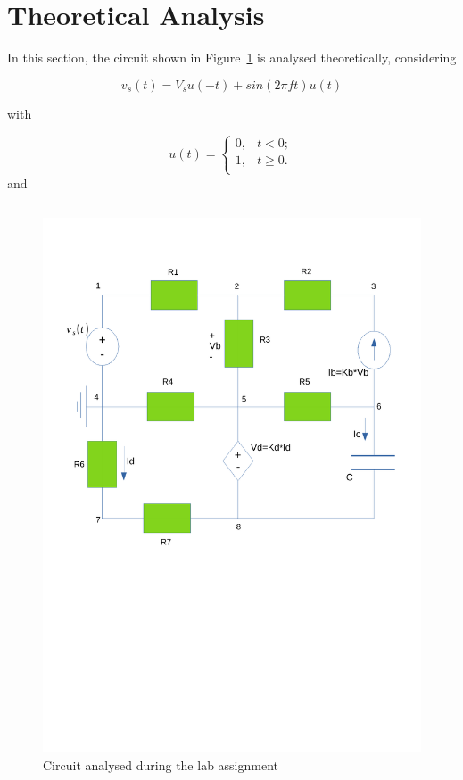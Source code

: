 \section{Theoretical Analysis}
\label{sec:theoretical}

\noindent \par In this section, the circuit shown in Figure~\ref{fig:Esquema_teo} is analysed theoretically, considering

\begin{equation}
	v_s(t) = V_s u(-t) + sin(2 \pi ft)u(t)
\end{equation}

with

\begin{equation}
u(t)= \begin{cases} 
	     0, & t<0; \\ 
	     1, & t \geq 0. \\
      \end{cases}
\end{equation}
and

\begin{table}[H]
\centering
\begin{tabularx}{0.8\textwidth} {
  | >{\raggedright\arraybackslash}X
  | >{\raggedleft\arraybackslash}X | }
 \hline
 
\end{tabularx}
\end{table}

\begin{figure}[H] \centering
\includegraphics[width=0.8\linewidth]{Esquema_teo.pdf}
\caption{Circuit analysed during the lab assignment}
\label{fig:Esquema_teo}
\end{figure}

